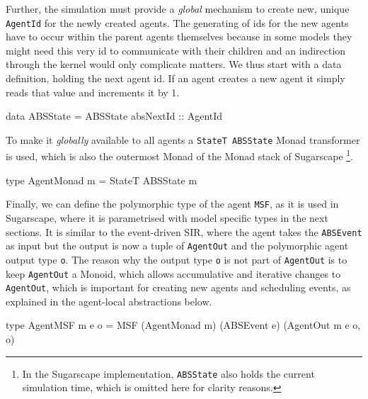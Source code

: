 Further, the simulation must provide a \textit{global} mechanism to create new, unique \texttt{AgentId} for the newly created agents. The generating of ids for the new agents have to occur within the parent agents themselves because in some models they might need this very id to communicate with their children and an indirection through the kernel would only complicate matters. We thus start with a data definition, holding the next agent id. If an agent creates a new agent it simply reads that value and increments it by 1.

\begin{HaskellCode}
data ABSState = ABSState { absNextId :: AgentId }
\end{HaskellCode}

To make it \textit{globally} available to all agents a \texttt{StateT ABSState} Monad transformer is used, which is also the outermost Monad of the Monad stack of Sugarscape \footnote{In the Sugarscape implementation, \texttt{ABSState} also holds the current simulation time, which is omitted here for clarity reasons.}.

\begin{HaskellCode}
type AgentMonad m = StateT ABSState m
\end{HaskellCode}

Finally, we can define the polymorphic type of the agent \texttt{MSF}, as it is used in Sugarscape, where it is parametrised with model specific types in the next sections. It is similar to the event-driven SIR, where the agent takes the \texttt{ABSEvent} as input but the output is now a tuple of \texttt{AgentOut} and the polymorphic agent output type \texttt{o}. The reason why the output type \texttt{o} is not part of \texttt{AgentOut} is to keep \texttt{AgentOut} a Monoid, which allows accumulative and iterative changes to \texttt{AgentOut}, which is important for creating new agents and scheduling events, as explained in the agent-local abstractions below.

\begin{HaskellCode}
type AgentMSF m e o = MSF (AgentMonad m) (ABSEvent e) (AgentOut m e o, o)
\end{HaskellCode}